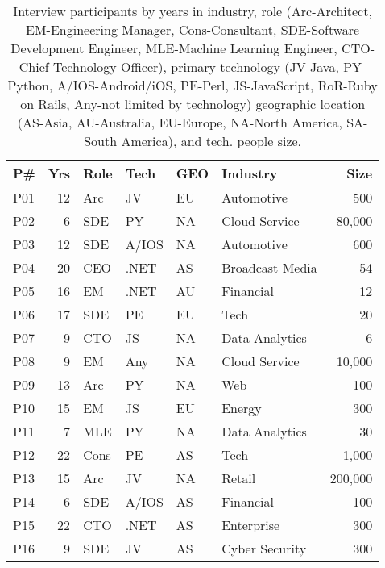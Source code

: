 
\begin{table}[]
    \centering
        \caption{Interview participants by years in industry, role (Arc-Architect, EM-Engineering Manager, Cons-Consultant, SDE-Software Development Engineer, MLE-Machine Learning Engineer, CTO-Chief Technology Officer), primary technology (JV-Java, PY-Python, A/IOS-Android/iOS, PE-Perl, JS-JavaScript, RoR-Ruby on Rails, Any-not limited by technology) geographic location (AS-Asia, AU-Australia, EU-Europe, NA-North America, SA-South America), and tech. people size.}
    \begin{tabular}{lrlll|lr}
\toprule
P\# & Yrs & Role & Tech & GEO & Industry & Size \\
\midrule
P01 & 12 & Arc & JV & EU & Automotive & 500  \\ 
P02 & 6 & SDE & PY & NA & Cloud Service & 80,000  \\ 
P03 & 12 & SDE & A/IOS & NA & Automotive & 600  \\ 
P04 & 20 & CEO & .NET & AS & Broadcast Media & 54  \\ 
P05 & 16 & EM & .NET & AU & Financial & 12 \\ 
P06 & 17 & SDE & PE & EU & Tech & 20 \\ 
P07 & 9 & CTO & JS & NA & Data Analytics & 6 \\ 
P08 & 9 & EM & Any & NA & Cloud Service & 10,000 \\ 
P09 & 13 & Arc & PY & NA & Web & 100 \\ 
P10 & 15 & EM & JS & EU & Energy & 300 \\ 
P11 & 7 & MLE & PY & NA & Data Analytics & 30 \\ 
P12 & 22 & Cons & PE & AS & Tech & 1,000 \\ 
P13 & 15 & Arc & JV & NA & Retail & 200,000 \\ 
P14 & 6 & SDE & A/IOS & AS & Financial & 100 \\ 
P15 & 22 & CTO & .NET & AS & Enterprise & 300 \\ 
P16 & 9 & SDE & JV & AS & Cyber Security & 300 \\ 

\end{tabular}
\end{table}
